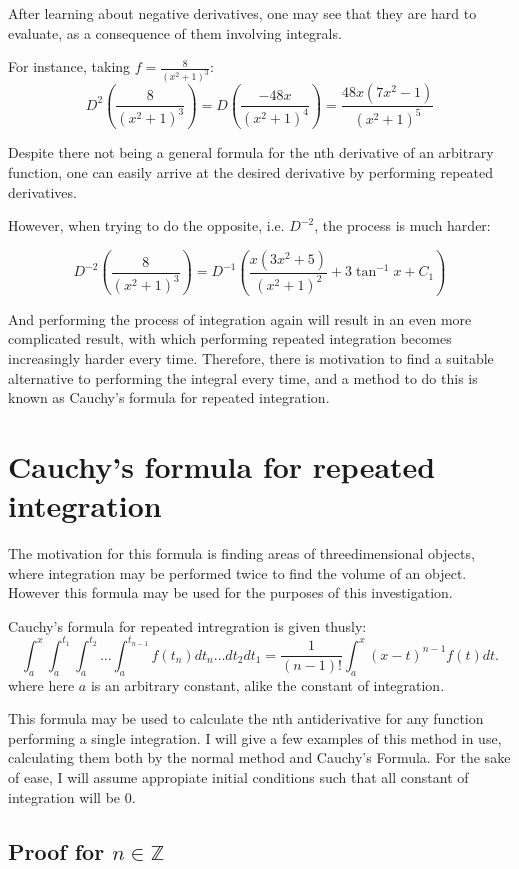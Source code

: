 \documentclass{article}
\begin{document}
After learning about negative derivatives, one may see that they are hard to
evaluate, as a consequence of them involving integrals.

For instance, taking $f = \frac{8}{(x^2+1)^3}$:
$$
D^2\left(\frac{8}{(x^2+1)^3}\right) =
D\left(\frac{-48x}{(x^2+1)^4}\right) =
\frac{48x(7x^2-1)}{(x^2+1)^5}
$$

Despite there not being a general formula for the nth derivative of an
arbitrary function, one can easily arrive at the desired derivative by
performing repeated derivatives.

However, when trying to do the opposite, i.e. $D^{-2}$, the process is much
harder:

$$
D^{-2}\left(\frac{8}{(x^2+1)^3}\right) =
D^{-1}\left(\frac{x\left(3x^2+5\right)}{\left(x^2+1\right)^2} +
3\tan^{-1}{x} + C_1 \right)
$$

And performing the process of integration again will result in an even more
complicated result, with which performing repeated integration becomes
increasingly harder every time. Therefore, there is motivation to find a
suitable alternative to performing the integral every time, and a method to do
this is known as Cauchy's formula for repeated integration.

\section{Cauchy's formula for repeated integration}

The motivation for this formula is finding areas of threedimensional objects,
where integration may be performed twice to find the volume of an
object. However this formula may be used for the purposes of this investigation.

Cauchy's formula for repeated intregration is given thusly:
$$
\int_a^x
\int_a^{t_1}
\int_a^{t_2}
\ldots
\int_a^{t_{n-1}}f\left(t_n\right) dt_n \ldots dt_2 dt_1
=
\frac{1}{(n-1)!}\int_a^x\left(x-t\right)^{n-1}f\left(t\right)dt.
$$
where here $a$ is an arbitrary constant, alike the constant of integration.

This formula may be used to calculate the nth antiderivative for any function
performing a single integration. I will give a few examples of this method in
use, calculating them both by the normal method and Cauchy's Formula. For the
sake of ease, I will assume appropiate initial conditions such that all
constant of integration will be $0$.


\subsection{Proof for \texorpdfstring{$n \in \mathbb{Z}$}{n in Z}}
\end{document}
